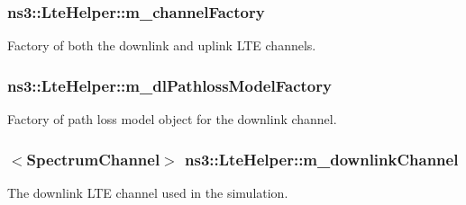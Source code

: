 \subsubsection[{\texorpdfstring{m\+\_\+channel\+Factory}{m_channelFactory}}]{ ns3\+::\+Lte\+Helper\+::m\+\_\+channel\+Factory\hspace{0.3cm}{\ttfamily [private]}}\hypertarget{classns3_1_1LteHelper_a31d833547d5db8c7a040ce65f328c529}{}\label{classns3_1_1LteHelper_a31d833547d5db8c7a040ce65f328c529}


Factory of both the downlink and uplink L\+TE channels. 

\subsubsection[{\texorpdfstring{m\+\_\+dl\+Pathloss\+Model\+Factory}{m_dlPathlossModelFactory}}]{ ns3\+::\+Lte\+Helper\+::m\+\_\+dl\+Pathloss\+Model\+Factory\hspace{0.3cm}{\ttfamily [private]}}\hypertarget{classns3_1_1LteHelper_a1e60fb862e68676d8aabb29e2ea2dfd9}{}\label{classns3_1_1LteHelper_a1e60fb862e68676d8aabb29e2ea2dfd9}


Factory of path loss model object for the downlink channel. 

\subsubsection[{\texorpdfstring{m\+\_\+downlink\+Channel}{m_downlinkChannel}}]{$<${\bf Spectrum\+Channel}$>$ ns3\+::\+Lte\+Helper\+::m\+\_\+downlink\+Channel\hspace{0.3cm}{\ttfamily [private]}}\hypertarget{classns3_1_1LteHelper_a5c2237946550d801d80c0d0bee0b4cfb}{}\label{classns3_1_1LteHelper_a5c2237946550d801d80c0d0bee0b4cfb}


The downlink L\+TE channel used in the simulation. 

